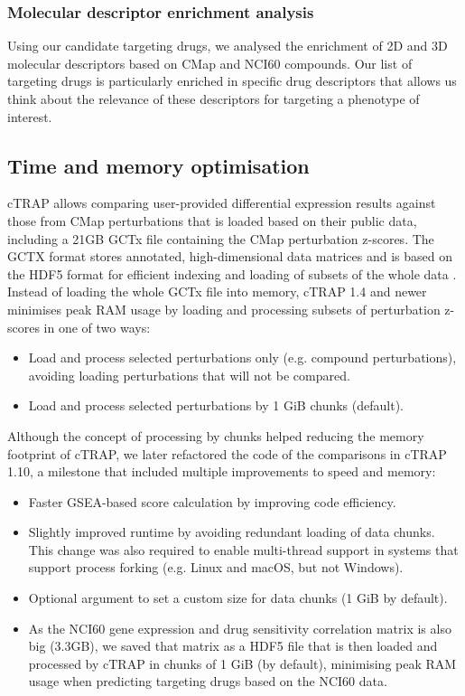 \subsubsection{Molecular descriptor enrichment analysis}

Using our candidate targeting drugs, we analysed the enrichment of 2D and 3D molecular descriptors based on CMap and NCI60 compounds. Our list of targeting drugs is particularly enriched in specific drug descriptors that allows us think about the relevance of these descriptors for targeting a phenotype of interest.

\subsection{Time and memory optimisation}
\label{subsec:ctrap-optim}

cTRAP allows comparing user-provided differential expression results against those from CMap perturbations that is loaded based on their public data, including a 21GB GCTx file containing the CMap perturbation z-scores. The GCTX format stores annotated, high-dimensional data matrices and is based on the HDF5 format for efficient indexing and loading of subsets of the whole data \cite{enache:2018wq}. Instead of loading the whole GCTx file into memory, cTRAP 1.4 and newer minimises peak RAM usage by loading and processing subsets of perturbation z-scores in one of two ways:

\begin{itemize}
	\item Load and process selected perturbations only (e.g. compound perturbations), avoiding loading perturbations that will not be compared.
	\item Load and process selected perturbations by 1 GiB chunks (default).
\end{itemize}

Although the concept of processing by chunks helped reducing the memory footprint of cTRAP, we later refactored the code of the comparisons in cTRAP 1.10, a milestone that included multiple improvements to speed and memory:

\begin{itemize}
	\item Faster GSEA-based score calculation by improving code efficiency.
	\item Slightly improved runtime by avoiding redundant loading of data chunks. This change was also required to enable multi-thread support in systems that support process forking (e.g. Linux and macOS, but not Windows).
	\item Optional argument to set a custom size for data chunks (1 GiB by default).
	\item As the NCI60 gene expression and drug sensitivity correlation matrix is also big (3.3GB), we saved that matrix as a HDF5 file that is then loaded and processed by cTRAP in chunks of 1 GiB (by default), minimising peak RAM usage when predicting targeting drugs based on the NCI60 data.
\end{itemize}

